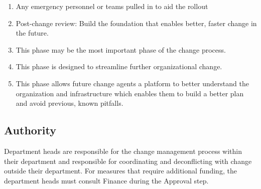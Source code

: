 \documentclass[../main.tex]{subfiles}
\begin{document}
\begin{enumerate}
\begin{enumerate}
        \item Any emergency personnel or teams pulled in to aid the rollout
        \item Post-change review: Build the foundation that enables better, faster change in the future.
        \item This phase may be the most important phase of the change process.
        \item This phase is designed to streamline further organizational change.
        \item This phase allows future change agents a platform to better understand the organization and infrastructure which enables them to build a better plan and avoid previous, known pitfalls.
    \end{enumerate}
\end{enumerate}
\subsection{Authority}
Department heads are responsible for the change management process within their department and responsible for coordinating and deconflicting with change outside their department. For measures that require additional funding, the department heads must consult Finance during the Approval step. 
\end{document}
